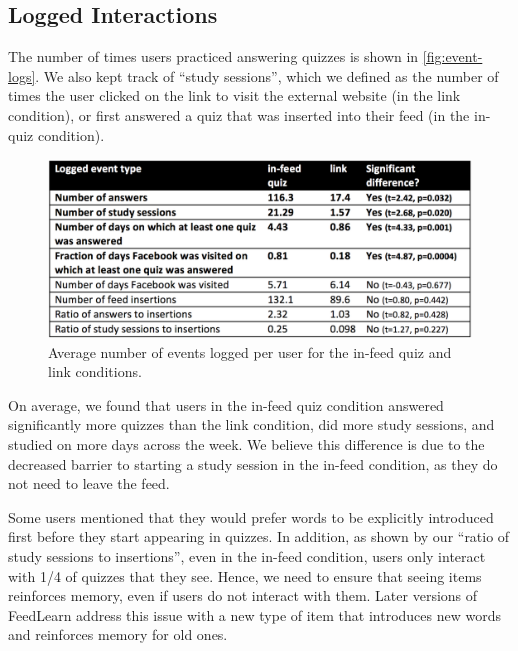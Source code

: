 \documentclass{sigchi}
\begin{document}
\subsection{Logged Interactions}

The number of times users practiced answering quizzes is shown in \autoref{fig:event-logs}. We also kept track of ``study sessions'', which we defined as the number of times the user clicked on the link to visit the external website (in the link condition), or first answered a quiz that was inserted into their feed (in the in-quiz condition). %

\begin{figure}
\centering
\includegraphics[width=1.0\columnwidth]{event-logs-feedlearn}
\caption{Average number of events logged per user for the in-feed quiz and link conditions.}
\label{fig:event-logs}
\end{figure}

On average, we found that users in the in-feed quiz condition answered significantly more quizzes than the link condition, did more study sessions, and studied on more days across the week. We believe this difference is due to the decreased barrier to starting a study session in the in-feed condition, as they do not need to leave the feed.


Some users mentioned that they would prefer words to be explicitly introduced first before they start appearing in quizzes.  In addition, as shown by our ``ratio of study sessions to insertions'', even in the in-feed condition, users only interact with 1/4 of quizzes that they see. Hence, we need to ensure that seeing items reinforces memory, even if users do not interact with them. Later versions of FeedLearn address this issue with a new type of item that introduces new words and reinforces memory for old ones.
\end{document}
